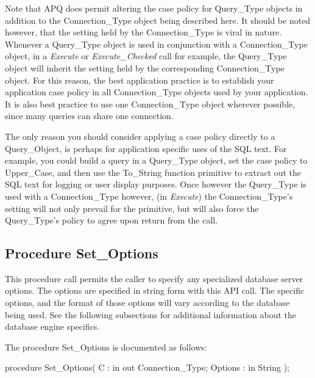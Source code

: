 \documentclass[english,letterpaper]{book}
\begin{document}
Note that APQ does permit altering the case policy for Query\_Type
objects in addition to the Connection\_Type object being described
here. It should be noted however, that the setting held by the Connection\_Type
is viral in nature. Whenever a Query\_Type object is used in conjunction
with a Connection\_Type object, in a \emph{Execute} 
or \emph{Execute\_Checked}
call for example, the Query\_Type object will inherit the setting
held by the corresponding Connection\_Type object. For this reason,
the best application practice is to establish your application case
policy in all Connection\_Type objects used by your application. It
is also best practice to use one Connection\_Type object wherever
possible, since many queries can share one connection.

The only reason you should consider applying a case policy directly
to a Query\_Object, is perhaps for application specific uses of the
SQL text. For example, you could build a query in a Query\_Type object,
set the case policy to Upper\_Case, and then use the To\_String function
primitive to extract out the SQL text for logging or user display
purposes. Once however the Query\_Type is used with a Connection\_Type
however, (in \emph{Execute}) the Connection\_Type's setting will not
only prevail for the primitive, but will also force the Query\_Type's
policy to agree upon return from the call.


\subsection{Procedure Set\_Options\label{Procedure Set_Options}}

This procedure call permits the caller to specify any specialized
database server options. The options are specified in string form
with this API call. The specific options, and the format of those
options will vary according to the database being used. See the following
subsections for additional information about the database engine specifics.

The procedure Set\_Options is documented as follows:

\begin{Code}
procedure Set_Options(
   C :       in out Connection_Type;
   Options : in     String
);
\end{Code}
\end{document}
